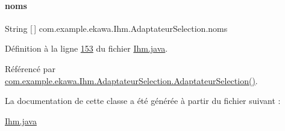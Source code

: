 \paragraph{\texorpdfstring{noms}{noms}}
{\footnotesize\ttfamily String \mbox{[}$\,$\mbox{]} com.\+example.\+ekawa.\+Ihm.\+Adaptateur\+Selection.\+noms\hspace{0.3cm}{\ttfamily [private]}}



Définition à la ligne \hyperlink{_ihm_8java_source_l00153}{153} du fichier \hyperlink{_ihm_8java_source}{Ihm.\+java}.



Référencé par \hyperlink{_ihm_8java_source_l00156}{com.\+example.\+ekawa.\+Ihm.\+Adaptateur\+Selection.\+Adaptateur\+Selection()}.



La documentation de cette classe a été générée à partir du fichier suivant \+:\begin{DoxyCompactItemize}
\item 
\hyperlink{_ihm_8java}{Ihm.\+java}\end{DoxyCompactItemize}
